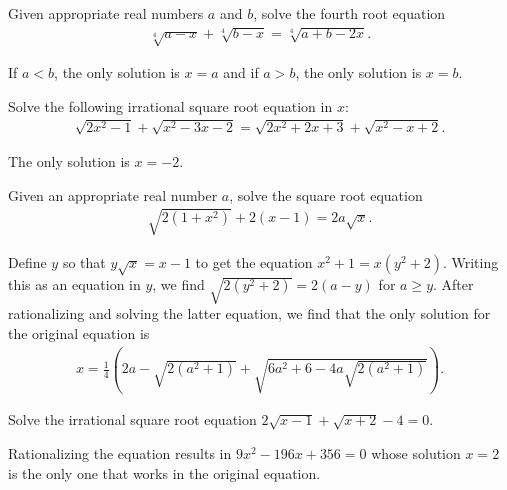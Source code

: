 \documentclass[12pt,a4paper]{memoir}
\theoremstyle{definition}
\begin{document}
\begin{question}\label{p:irrational-R}
	Given appropriate real numbers $a$ and $b$, solve the fourth root equation
	\begin{align*}
		\sqrt[4]{a-x}+\sqrt[4]{b-x}=\sqrt[4]{a+b-2x}.
	\end{align*}
\end{question}

\begin{solution}
	If $a<b$, the only solution is $x=a$ and if $a>b$, the only solution is $x=b$.
\end{solution}

\begin{question}\label{p:irrational-S}
	Solve the following irrational square root equation in $x$:
	\begin{align*}
		\sqrt{2x^2-1}+\sqrt{x^2-3x-2} = \sqrt{2x^2+2x+3}+\sqrt{x^2-x+2}.
	\end{align*}
\end{question}

\begin{solution}
	The only solution is $x=-2$.
\end{solution}


\begin{question}\label{p:irrational-T}
	Given an appropriate real number $a$, solve the square root equation
	\begin{align*}
		\sqrt{2(1+x^2)}+2(x-1)=2a\sqrt{x}.
	\end{align*}
\end{question}

\begin{solution}
	Define $y$ so that $y\sqrt x = x-1$ to get the equation $x^2+1=x(y^2+2)$. Writing this as an equation in $y$, we find $\sqrt{2(y^2+2)}=2(a-y)$ for $a\geq y$. After rationalizing and solving the latter equation, we find that the only solution for the original equation is
	\begin{align*}
		x = \frac{1}{4}\left(2a - \sqrt{2(a^2+1)} +\sqrt{6a^2+6-4a\sqrt{2(a^2+1)}}\right).
	\end{align*}
\end{solution}


\begin{question}\label{p:irrational-U}
	Solve the irrational square root equation $2\sqrt{x-1}+\sqrt{x+2}-4=0$.
\end{question}

\begin{solution}
	Rationalizing the equation results in $9x^2-196x+356=0$ whose solution $x=2$ is the only one that works in the original equation.
\end{solution}
\end{document}
